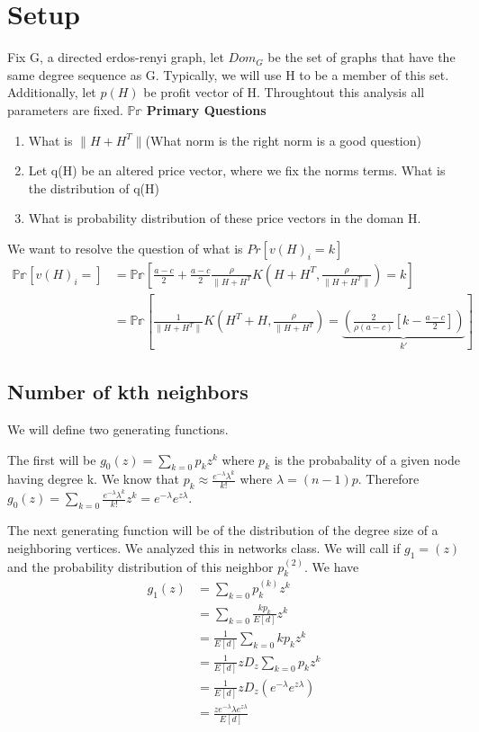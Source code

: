 \documentclass[11pt]{article}
\author{Calvin Roth}
\date{\today}
\title{}
\begin{document}
\newcommand{\pr}{$\mathbb{Pr}$}

\newcommand{\ppr}{\mathbb{P}\mathbb{r}}

\section{Setup}
Fix G, a directed erdos-renyi graph, let $Dom_{G}$ be the set of graphs that have the same degree sequence as G. Typically, we will use H to be a member of this set. Additionally, let $p(H)$ be profit vector of H. Throughtout this analysis all parameters are fixed.
\pr
\textbf{Primary Questions}
\begin{enumerate}
  \item What is $\| H + H^{T}\|$(What norm is the right norm is a good question) \\
  \item Let q(H) be an altered price vector, where we fix the norms terms. What is the distribution of q(H) \\
  \item What is probability distribution of these price vectors in the doman H. \\
\end{enumerate}

We want to resolve the question of what is $Pr[v(H)_{i} = k]$
\begin{align*}
  \ppr [v(H)_{i} = ] &= \ppr [ \frac{a-c}{2} + \frac{a-c}{2} \frac{\rho}{\|H+H^{T}} K(H+H^{T}, \frac{\rho}{\|H+H^{T}\|}) = k ]\\
  &= \ppr [\frac{1}{\|H+H^{T}\|} K(H^{T}+H, \frac{\rho}{\|H+H^{T}}) = \underbrace{( \frac{2}{\rho(a-c)} [k - \frac{a-c}{2}] )}_{k'}]
\end{align*}

\subsection{Number of kth neighbors}
We will define two generating functions.

The first will be $g_{0}(z) = \sum_{k=0} p_{k} z^{k}$ where $p_{k}$ is the probabality of a given node having degree k. We know that $p_{k} \approx \frac{e^{-\lambda} \lambda^{k}}{k!}$ where $\lambda = (n-1)p$. Therefore $g_{0}(z) = \sum_{k=0} \frac{e^{-\lambda}\lambda^{k}}{k!} z^{k} = e^{-\lambda} e^{z\lambda}$.

The next generating function will be of the distribution of the degree size of a neighboring vertices.  We analyzed this in networks class. We will call if $g_{1} = (z)$ and the probability distribution of this neighbor $p_{k}^{(2)}$. We have
\begin{align*}
  g_{1}(z) &= \sum_{k=0} p_{k}^{(k)} z^{k} \\
       &= \sum_{k=0} \frac{k p_{k}}{E[d]} z^{k} \\
       &= \frac{1}{E[d]} \sum_{k=0} k p_{k} z^{k} \\
       &= \frac{1}{E[d]}  z D_{z} \sum_{k=0} p_{k} z^{k}\\
       &= \frac{1}{E[d]} z D_{z} (e^{-\lambda} e^{z\lambda}) \\
       &= \frac{z e^{-\lambda} \lambda e^{z\lambda}}{E[d]}
\end{align*}
\end{document}
